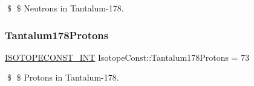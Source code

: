 \$ \$ Neutrons in Tantalum-\/178. \mbox{\label{group___isotope_const-_tantalum-_ta178_ga20d57778e7b02a63191a88cfc6d5d8ba}} 
\subsubsection{\texorpdfstring{Tantalum178\+Protons}{Tantalum178Protons}}
{\footnotesize\ttfamily \mbox{\hyperlink{group___isotope_const-_macros_ga5f18360b3e99483a35c32d789e62621c}{I\+S\+O\+T\+O\+P\+E\+C\+O\+N\+S\+T\+\_\+\+I\+NT}} Isotope\+Const\+::\+Tantalum178\+Protons = 73}

\$ \$ Protons in Tantalum-\/178. 